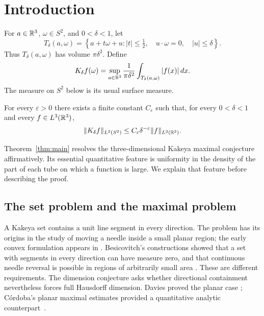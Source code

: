 \section{Introduction}\label{sec:introduction}

For \(a\in\mathbb R^3\), \(\omega\in S^2\), and \(0<\delta<1\), let
\[
T_\delta(a,\omega)=
\left\{a+t\omega+u:
 |t|\le\tfrac12,\quad u\cdot\omega=0,\quad |u|\le\delta\right\}.
\]
Thus \(T_\delta(a,\omega)\) has volume \(\pi\delta^2\). Define
\[
K_\delta f(\omega)=
\sup_{a\in\mathbb R^3}\frac1{\pi\delta^2}
\int_{T_\delta(a,\omega)}|f(x)|\,dx .
\]
The measure on \(S^2\) below is its usual surface measure.

\begin{theorem}\label{thm:main}
For every \(\varepsilon>0\) there exists a finite constant
\(C_\varepsilon\) such that, for every \(0<\delta<1\) and every
\(f\in L^3(\mathbb R^3)\),
\[
\|K_\delta f\|_{L^3(S^2)}
\le C_\varepsilon\delta^{-\varepsilon}
     \|f\|_{L^3(\mathbb R^3)}.
\]
\end{theorem}

Theorem~\ref{thm:main} resolves the three-dimensional Kakeya maximal
conjecture affirmatively. Its essential quantitative feature is uniformity
in the density of the part of each tube on which a function is large.
We explain that feature before describing the proof.

\subsection{The set problem and the maximal problem}

A Kakeya set contains a unit line segment in every direction. The problem
has its origins in the study of moving a needle inside a small planar
region; the early convex formulation appears in
\citet[Section~10]{FujiwaraKakeya1917}. Besicovitch's constructions
showed that a set with segments in every direction can have measure zero,
and that continuous needle reversal is possible in regions of arbitrarily
small area \citep{Besicovitch1928,Davies1971}. These are different
requirements. The dimension conjecture asks whether directional
containment nevertheless forces full Hausdorff dimension. Davies proved
the planar case \citep{Davies1971}; C\'ordoba's planar maximal estimates
provided a quantitative analytic counterpart~\citep{Cordoba1977}.

